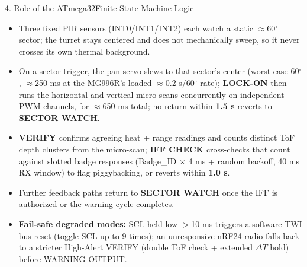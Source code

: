\documentclass[aspectratio=169, 10pt]{beamer}
\begin{document}
\begin{frame}{4. Role of the ATmega32}{Finite State Machine Logic}
    \vspace{0.08cm}
    \begin{itemize}
        \footnotesize
        \item Three fixed PIR sensors (INT0/INT1/INT2) each watch a static $\approx$60$^\circ$ sector; the turret stays centered and does not mechanically sweep, so it never crosses its own thermal background.
        \item On a sector trigger, the pan servo slews to that sector's center (worst case 60$^\circ$, $\approx$250 ms at the MG996R's loaded $\approx$0.2 s/60$^\circ$ rate); \textbf{LOCK-ON} then runs the horizontal and vertical micro-scans concurrently on independent PWM channels, for $\approx$650 ms total; no return within \textbf{1.5 s} reverts to \textbf{SECTOR WATCH}.
        \item \textbf{VERIFY} confirms agreeing heat + range readings and counts distinct ToF depth clusters from the micro-scan; \textbf{IFF CHECK} cross-checks that count against slotted badge responses (Badge\_ID $\times$ 4 ms + random backoff, 40 ms RX window) to flag piggybacking, or reverts within \textbf{1.0 s}.
        \item Further feedback paths return to \textbf{SECTOR WATCH} once the IFF is authorized or the warning cycle completes.
        \item \textbf{Fail-safe degraded modes:} SCL held low $>$10 ms triggers a software TWI bus-reset (toggle SCL up to 9 times); an unresponsive nRF24 radio falls back to a stricter High-Alert VERIFY (double ToF check + extended $\Delta T$ hold) before WARNING OUTPUT.
    \end{itemize}
\end{frame}
\end{document}
